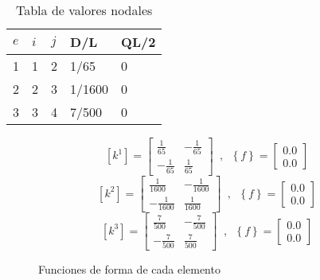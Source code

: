 \documentclass{article}
\begin{document}
\begin{table}[!h]
    \centering
        \begin{tabular}{@{}lllll@{}}
        \toprule
        $e$ & $i$ & $j$ & D/L    & QL/2 \\ \midrule
        1 & 1 & 2 & 1/65   & 0    \\
        2 & 2 & 3 & 1/1600 & 0    \\
        3 & 3 & 4 & 7/500  & 0    \\ \bottomrule
    \end{tabular}
    \caption{Tabla de valores nodales}
\end{table}

\begin{figure}[!h]
    \begin{equation}
        \left [ k^{1} \right ]= \begin{bmatrix}
        \frac{1}{65} & -\frac{1}{65}\\ 
        -\frac{1}{65} & \frac{1}{65}
        \end{bmatrix}\phantom{a},\phantom{a}
        \left \{ f \right \}=\begin{bmatrix}
        0.0\\0.0
        \end{bmatrix}
    \end{equation}
    \begin{equation}
        \left [ k^{2} \right ]= \begin{bmatrix}
        \frac{1}{1600} & -\frac{1}{1600}\\ 
        -\frac{1}{1600} & \frac{1}{1600}
        \end{bmatrix}\phantom{a},\phantom{a}
        \left \{ f \right \}=\begin{bmatrix}
        0.0\\0.0
        \end{bmatrix}
    \end{equation}
    \begin{equation}
        \left [ k^{3} \right ]= \begin{bmatrix}
        \frac{7}{500} & -\frac{7}{500}\\ 
        -\frac{7}{500} & \frac{7}{500}
        \end{bmatrix}\phantom{a},\phantom{a}
        \left \{ f \right \}=\begin{bmatrix}
        0.0\\0.0
        \end{bmatrix}
    \end{equation}
    \caption{Funciones de forma de cada elemento}
\end{figure}
\end{document}
